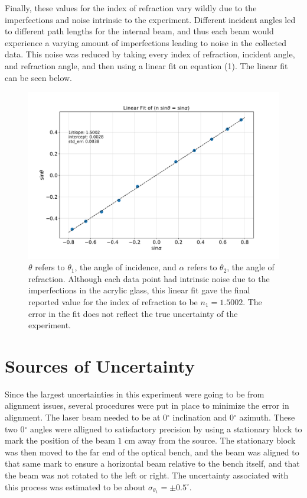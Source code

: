 \documentclass[colorlinks=true,pdfstartview=FitV,linkcolor=blue,
            citecolor=red,urlcolor=magenta]{basedoc}
\begin{document}
  Finally, these values for the index of refraction vary wildly due to the imperfections and noise intrinsic to the experiment. Different incident angles led to different path lengths for the internal beam, and thus each beam would experience a varying amount of imperfections leading to noise in the collected data. This noise was reduced by taking every index of refraction, incident angle, and refraction angle, and then using a linear fit on equation (1). The linear fit can be seen below.

    \begin{figure}[!h]
      \begin{center}
      \includegraphics[width=5in]{resources/LinearFit.pdf}
      \caption{$\theta$ refers to $\theta_1$, the angle of incidence, and $\alpha$ refers to $\theta_2$, the angle of refraction. Although each data point had intrinsic noise due to the imperfections in the acrylic glass, this linear fit gave the final reported value for the index of refraction to be $n_1 = 1.5002$. The error in the fit does not reflect the true uncertainty of the experiment.}
      \label{fig:lin_fit_snell}
      \end{center}
    \end{figure}

\pagebreak
\section{Sources of Uncertainty}
  Since the largest uncertainties in this experiment were going to be from alignment issues, several procedures were put in place to minimize the error in alignment. The laser beam needed to be at 0$^{\circ}$ inclination and 0$^{\circ}$ azimuth. These two 0$^{\circ}$ angles were alligned to satisfactory precision by using a stationary block to mark the position of the beam $1$ cm away from the source. The stationary block was then moved to the far end of the optical bench, and the beam was aligned to that same mark to ensure a horizontal beam relative to the bench itself, and that the beam was not rotated to the left or right. The uncertainty associated with this process was estimated to be about $\sigma_{\theta_1} = \pm 0.5^{\circ}$.
\end{document}

